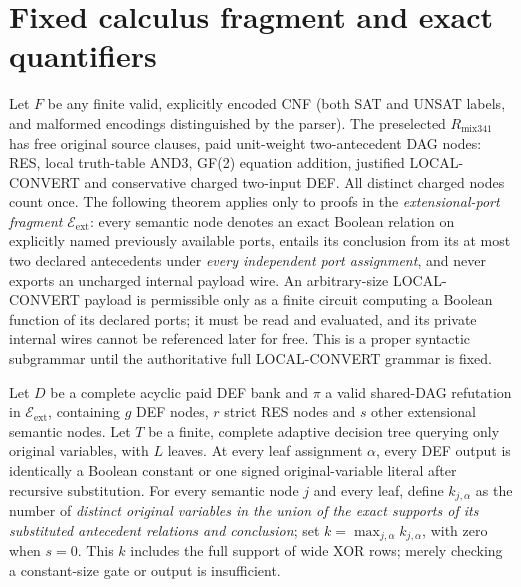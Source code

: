 \documentclass[11pt]{article}
\begin{document}
\section*{Fixed calculus fragment and exact quantifiers}
Let \(F\) be any finite valid, explicitly encoded CNF (both SAT and UNSAT labels, and malformed encodings distinguished by the parser). The preselected \(R_{\mathrm{mix341}}\) has free original source clauses, paid unit-weight two-antecedent DAG nodes: RES, local truth-table AND3, GF(2) equation addition, justified LOCAL-CONVERT and conservative charged two-input DEF. All distinct charged nodes count once. The following theorem applies only to proofs in the \emph{extensional-port fragment} \(\mathcal E_{\mathrm{ext}}\): every semantic node denotes an exact Boolean relation on explicitly named previously available ports, entails its conclusion from its at most two declared antecedents under \emph{every independent port assignment}, and never exports an uncharged internal payload wire. An arbitrary-size LOCAL-CONVERT payload is permissible only as a finite circuit computing a Boolean function of its declared ports; it must be read and evaluated, and its private internal wires cannot be referenced later for free. This is a proper syntactic subgrammar until the authoritative full LOCAL-CONVERT grammar is fixed.

Let \(D\) be a complete acyclic paid DEF bank and \(\pi\) a valid shared-DAG refutation in \(\mathcal E_{\mathrm{ext}}\), containing \(g\) DEF nodes, \(r\) strict RES nodes and \(s\) other extensional semantic nodes. Let \(T\) be a finite, complete adaptive decision tree querying only original variables, with \(L\) leaves. At every leaf assignment \(\alpha\), every DEF output is identically a Boolean constant or one signed original-variable literal after recursive substitution. For every semantic node \(j\) and every leaf, define \(k_{j,\alpha}\) as the number of \emph{distinct original variables in the union of the exact supports of its substituted antecedent relations and conclusion}; set \(k=\max_{j,\alpha}k_{j,\alpha}\), with zero when \(s=0\). This \(k\) includes the full support of wide XOR rows; merely checking a constant-size gate or output is insufficient.
\end{document}
